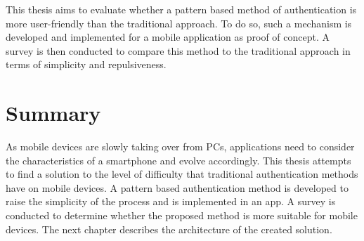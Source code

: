 This thesis aims to evaluate whether a pattern based method of authentication is more user-friendly than the traditional approach. To do so, such a mechanism is developed and implemented for a mobile application as proof of concept. A survey is then conducted to compare this method to the traditional approach in terms of simplicity and repulsiveness. 

\section{Summary}

As mobile devices are slowly taking over from PCs, applications need to consider the characteristics of a smartphone and evolve accordingly. This thesis attempts to find a solution to the level of difficulty that traditional authentication methods have on mobile devices. A pattern based authentication method is developed to raise the simplicity of the process and is implemented in an app. A survey is conducted to determine whether the proposed method is more suitable for mobile devices. The next chapter describes the architecture of the created solution. 




